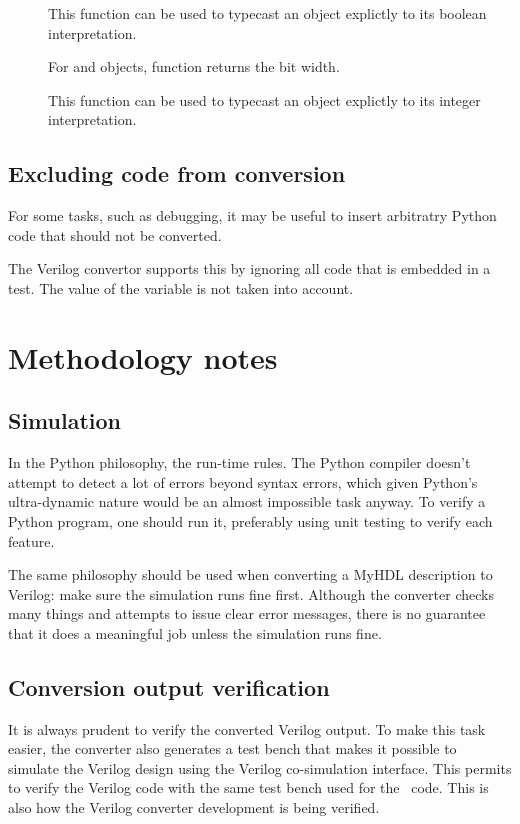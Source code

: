 \begin{description}
\item[]
This function can be used to typecast an object explictly to
its boolean interpretation.

\item[]
For  and  objects, function 
returns the bit width.

\item[]
This function can be used to typecast an object explictly to
its integer interpretation.

\end{description}

\subsection{Excluding code from conversion \label{conv-subset-exclude}}
For some tasks, such as debugging, it may be useful to insert arbitratry
Python code that should not be converted.

The Verilog convertor supports this by ignoring all code that is
embedded in a  test. The value of the
 variable is not taken into account.

\section{Methodology notes\label{conv-meth}}

\subsection{Simulation\label{conv-meth-sim}}

In the Python philosophy, the run-time rules. The Python compiler
doesn't attempt to detect a lot of errors beyond syntax errors, which
given Python's ultra-dynamic nature would be an almost impossible task
anyway. To verify a Python program, one should run it, preferably
using unit testing to verify each feature.

The same philosophy should be used when converting a MyHDL description
to Verilog: make sure the simulation runs fine first. Although the
converter checks many things and attempts to issue clear error
messages, there is no guarantee that it does a meaningful job unless
the simulation runs fine.

\subsection{Conversion output verification\label{conv-meth-conv}}
It is always prudent to verify the converted Verilog output.
To make this task easier, the converter also generates a
test bench that makes it possible to simulate the Verilog
design using the Verilog co-simulation interface. This 
permits to verify the Verilog code with the same test
bench used for the \myhdl\ code. This is also how
the Verilog converter development is being verified.

